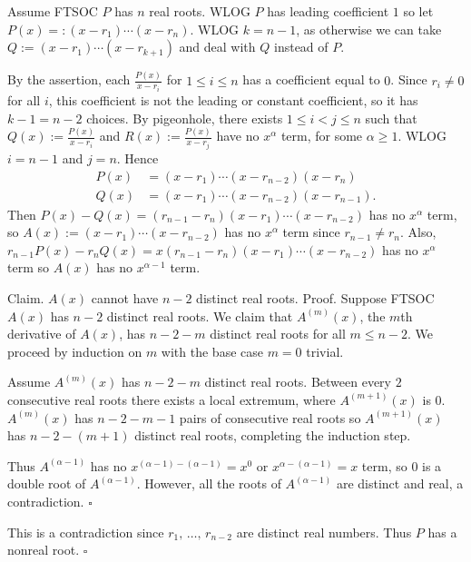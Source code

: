 Assume FTSOC $P$ has $n$ real roots. WLOG $P$ has leading coefficient $1$ so let $P(x)=:(x-r_1)\cdots(x-r_n)$. WLOG $k=n-1$, as otherwise we can take $Q:=(x-r_1)\cdots(x-r_{k+1})$ and deal with $Q$ instead of $P$.

By the assertion, each $\frac{P(x)}{x-r_i}$ for $1\leq i\leq n$ has a coefficient equal to $0$. Since $r_i\neq 0$ for all $i$, this coefficient is not the leading or constant coefficient, so it has $k-1=n-2$ choices. By pigeonhole, there exists $1\leq i<j\leq n$ such that $Q(x):=\frac{P(x)}{x-r_i}$ and $R(x):=\frac{P(x)}{x-r_j}$ have no $x^\alpha$ term, for some $\alpha\geq 1$. WLOG $i=n-1$ and $j=n$. Hence
\begin{align*}
P(x)&=(x-r_1)\cdots(x-r_{n-2})(x-r_n)\\
Q(x)&=(x-r_1)\cdots(x-r_{n-2})(x-r_{n-1}).
\end{align*}Then $P(x)-Q(x)=(r_{n-1}-r_n)(x-r_1)\cdots(x-r_{n-2})$ has no $x^\alpha$ term, so $A(x):=(x-r_1)\cdots(x-r_{n-2})$ has no $x^\alpha$ term since $r_{n-1}\neq r_n$. Also, $r_{n-1}P(x)-r_nQ(x)=x(r_{n-1}-r_n)(x-r_1)\cdots(x-r_{n-2})$ has no $x^\alpha$ term so $A(x)$ has no $x^{\alpha-1}$ term.

Claim. $A(x)$ cannot have $n-2$ distinct real roots.
Proof. Suppose FTSOC $A(x)$ has $n-2$ distinct real roots. We claim that $A^{(m)}(x)$, the $m$th derivative of $A(x)$, has $n-2-m$ distinct real roots for all $m\leq n-2$. We proceed by induction on $m$ with the base case $m=0$ trivial.

Assume $A^{(m)}(x)$ has $n-2-m$ distinct real roots. Between every $2$ consecutive real roots there exists a local extremum, where $A^{(m+1)}(x)$ is $0$. $A^{(m)}(x)$ has $n-2-m-1$ pairs of consecutive real roots so $A^{(m+1)}(x)$ has $n-2-(m+1)$ distinct real roots, completing the induction step.

Thus $A^{(\alpha-1)}$ has no $x^{(\alpha-1)-(\alpha-1)}=x^0$ or $x^{\alpha-(\alpha-1)}=x$ term, so $0$ is a double root of $A^{(\alpha-1)}$. However, all the roots of $A^{(\alpha-1)}$ are distinct and real, a contradiction. $\square$

This is a contradiction since $r_1,\,\ldots,\,r_{n-2}$ are distinct real numbers. Thus $P$ has a nonreal root. $\square$